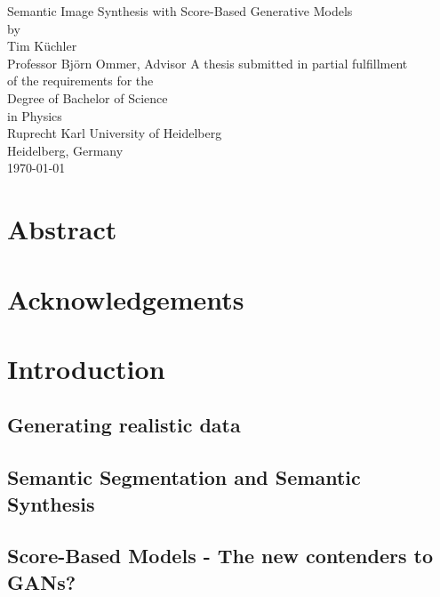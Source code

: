 \documentclass[a4paper, 12pt, oneside]{scrbook}
\begin{document}
\begin{titlepage}
\begin{center}
\vspace*{2cm}
{\huge Semantic Image Synthesis with Score-Based Generative Models} 
\vspace{2cm}\\
{\large by\\Tim Küchler}
\vspace{2cm}\\
{Professor Björn Ommer, Advisor}
\vfill
A thesis submitted in partial fulfillment\\
of the requirements for the\\
Degree of Bachelor of Science\\
in Physics\\
\vspace*{3cm}
Ruprecht Karl University of Heidelberg\\
Heidelberg, Germany\\
\today %
\end{center}
\end{titlepage}
%
\frontmatter 
\chapter{Abstract}
\begin{center}

\end{center}

\chapter{Acknowledgements}


\tableofcontents

\mainmatter
\chapter{Introduction}
\section{Generating realistic data} %

\section{Semantic Segmentation and Semantic Synthesis} %
\section{Score-Based Models - The new contenders to GANs?} %
\end{document}
